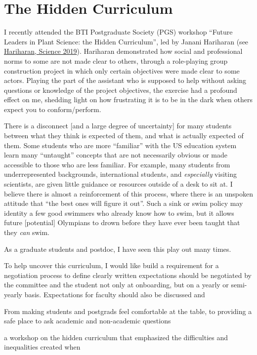 \documentclass[11pt]{article}
\begin{document}
\section{The Hidden Curriculum}

I recently attended the BTI Postgraduate Society (PGS) workshop ``Future Leaders in Plant Science: the Hidden Curriculum'', led by Janani Hariharan (see \href{science.sciencemag.org/content/364/6441/702.full}{Hariharan, Science 2019}). Hariharan demonstrated how social and professional norms to some are not made clear to others, through a role-playing group construction project in which only certain objectives were made clear to some actors. Playing the part of the assistant who is supposed to help without asking questions or knowledge of the project objectives, the exercise had a profound effect on me, shedding light on how frustrating it is to be in the dark when others expect you to conform/perform. 

There is a disconnect [and a large degree of uncertainty] for many students between what they think is expected of them, and what is actually expected of them. Some students who are more ``familiar'' with the US education system learn many ``untaught'' concepts that are not necessarily obvious or made accessible to those who are less familiar. For example, many students from underrepresented backgrounds, international students, and \emph{especially} visiting scientists, are given little guidance or resources outside of a desk to sit at. I believe there is almost a reinforcement of this process, where there is an unspoken attitude that ``the best ones will figure it out''. Such a sink or swim policy may identity a few good swimmers who already know how to swim, but it allows future [potential] Olympians to drown before they have ever been taught that they \emph{can} swim. 

As a graduate students and postdoc, I have seen this play out many times.

To help uncover this curriculum, I would like build a requirement for a negotiation process to define clearly written expectations should be negotiated by the committee and the student not only at onboarding, but on a yearly or semi-yearly basis. Expectations for faculty should also be discussed and 

From making students and postgrads feel comfortable at the table, to providing a safe place to ask academic and non-academic questions

a workshop on the hidden curriculum that emphasized the difficulties and inequalities created when  
\end{document}
